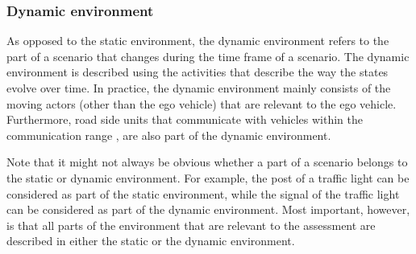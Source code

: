 \subsubsection{Dynamic environment}
\label{sec:dynamic environment}
As opposed to the static environment, the dynamic environment refers to the part of a scenario that changes during the time frame of a scenario. The dynamic environment is described using the activities that describe the way the states evolve over time. In practice, the dynamic environment mainly consists of the moving actors (other than the ego vehicle) that are relevant to the ego vehicle. 
Furthermore, road side units that communicate with vehicles within the communication range \cite{alsultan2014comprehensive}, are also part of the dynamic environment.

Note that it might not always be obvious whether a part of a scenario belongs to the static or dynamic environment. For example, the post of a traffic light can be considered as part of the static environment, while the signal of the traffic light can be considered as part of the dynamic environment. Most important, however, is that all parts of the environment that are relevant to the assessment are described in either the static or the dynamic environment.
